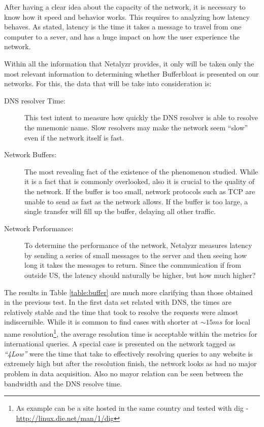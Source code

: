 After having a clear idea about the capacity of the network, it is necessary
to know how it speed and behavior works. This requires to analyzing how
latency behaves. As stated, latency is the time it takes a message to travel
from one computer to a sever, and has a huge impact on how the user experience
the network.

Within all the information that Netalyzr provides, it only will be taken only
the most relevant information to determining whether Bufferbloat is presented
on our networks. For this, the data that will be take into consideration is:

\begin{description}

\item [DNS resolver Time:] This test intent to measure how quickly the DNS
resolver is able to resolve the mnemonic name. Slow resolvers may make the
network seem ``slow'' even if the network itself is fast.

\item [Network Buffers:] The most revealing fact of the existence of the
phenomenon studied. While it is a fact that is commonly overlooked, also it is
crucial to the quality of the network. If the buffer is too small, network
protocols such as TCP are unable to send as fast as the network allows. If the
buffer is too large, a single transfer will fill up the buffer, delaying all
other traffic.

\item [Network Performance:] To determine the performance of the network,
Netalyzr measures latency by sending a series of small messages to the server
and then seeing how long it takes the messages to return. Since the
communication if from outside US, the latency should naturally be higher, but
how much higher?
\end{description}


The results in Table \ref{table:buffer} are much more clarifying than those
obtained in the previous test. In the first data set related with DNS, the
times are relatively stable and the time that took to resolve the requests
were almost indiscernible. While it is common to find cases with shorter at
$\sim15ms$ for local name resolution\footnote{ As example can be a site hosted
in the same country and tested with dig -
\url{http://linux.die.net/man/1/dig}}, the average resolution time is
acceptable within the metrics for international queries. A special case is
presented on the network tagged as \textit{``4Low''} were the time that take
to effectively resolving queries to any website is extremely high but after
the resolution finish, the network looks as had no major problem in data
acquisition. Also no mayor relation can be seen between the bandwidth and the
DNS resolve time.

